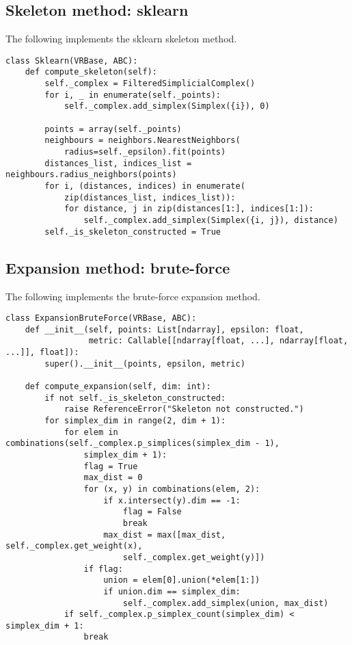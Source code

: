 \subsection{Skeleton method: sklearn}

The following implements the sklearn skeleton method. 

\begin{verbatim}
class Sklearn(VRBase, ABC):
    def compute_skeleton(self):
        self._complex = FilteredSimplicialComplex()
        for i, _ in enumerate(self._points):
            self._complex.add_simplex(Simplex({i}), 0)

        points = array(self._points)
        neighbours = neighbors.NearestNeighbors(
            radius=self._epsilon).fit(points)
        distances_list, indices_list = neighbours.radius_neighbors(points)
        for i, (distances, indices) in enumerate(
            zip(distances_list, indices_list)):
            for distance, j in zip(distances[1:], indices[1:]):
                self._complex.add_simplex(Simplex({i, j}), distance)
        self._is_skeleton_constructed = True
\end{verbatim}

\subsection{Expansion method: brute-force}

The following implements the brute-force expansion method.

\begin{verbatim}
class ExpansionBruteForce(VRBase, ABC):
    def __init__(self, points: List[ndarray], epsilon: float,
                 metric: Callable[[ndarray[float, ...], ndarray[float, ...]], float]):
        super().__init__(points, epsilon, metric)

    def compute_expansion(self, dim: int):
        if not self._is_skeleton_constructed:
            raise ReferenceError("Skeleton not constructed.")
        for simplex_dim in range(2, dim + 1):
            for elem in combinations(self._complex.p_simplices(simplex_dim - 1), 
                simplex_dim + 1):
                flag = True
                max_dist = 0
                for (x, y) in combinations(elem, 2):
                    if x.intersect(y).dim == -1:
                        flag = False
                        break
                    max_dist = max([max_dist, self._complex.get_weight(x), 
                        self._complex.get_weight(y)])
                if flag:
                    union = elem[0].union(*elem[1:])
                    if union.dim == simplex_dim:
                        self._complex.add_simplex(union, max_dist)
            if self._complex.p_simplex_count(simplex_dim) < simplex_dim + 1:
                break
\end{verbatim}

